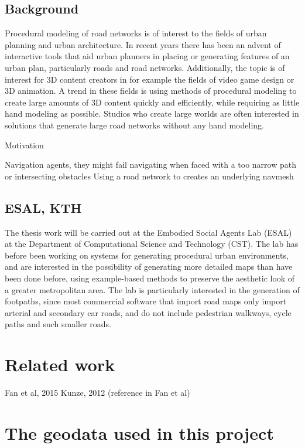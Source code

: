 \documentclass[a4paper]{article}
\begin{document}
\subsection{Background}

Procedural modeling of road networks is of interest to the fields of urban planning and urban architecture. In recent years there has been an advent of interactive tools that aid urban planners in placing or generating features of an urban plan, particularly roads and road networks.
Additionally, the topic is of interest for 3D content creators in for example the fields of video game design or 3D animation. A trend in these fields is using methods of procedural modeling to create large amounts of 3D content quickly and efficiently, while requiring as little hand modeling as possible. Studios who create large worlds are often interested in solutions that generate large road networks without any hand modeling.

Motivation

Navigation agents, they might fail navigating when faced with a too narrow path or intersecting obstacles
Using a road network to creates an underlying navmesh

\subsection{ESAL, KTH}
The thesis work will be carried out at the Embodied Social Agents Lab (ESAL) at the Department of Computational Science and Technology (CST). The lab has before been working on systems for generating procedural urban environments, and are interested in the possibility of generating more detailed maps than have been done before, using example-based methods to preserve the aesthetic look of a greater metropolitan area. The lab is particularly interested in the generation of footpaths, since most commercial software that import road maps only import arterial and secondary car roads, and do not include pedestrian walkways, cycle paths and such smaller roads.

\section{Related work}
Fan et al, 2015
Kunze, 2012 (reference in Fan et al)


\section{The geodata used in this project}
\end{document}
